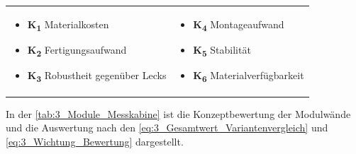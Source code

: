 \begin{tabular}{l l}
    \centering
    \hspace*{1cm} \parbox[c][3cm]{7cm}{
        \begin{itemize}[]
            \item \textbf{K\textsubscript{1}} Materialkosten
            \item \textbf{K\textsubscript{2}} Fertigungsaufwand
            \item \textbf{K\textsubscript{3}} Robustheit gegenüber Lecks
        \end{itemize}
    }&
    \parbox[c]{7cm}{
        \begin{itemize}[]
            \item \textbf{K\textsubscript{4}} Montageaufwand
            \item \textbf{K\textsubscript{5}} Stabilität
            \item \textbf{K\textsubscript{6}} Materialverfügbarkeit
        \end{itemize}
    }
\end{tabular}

In der \Tabelle\ref{tab:3_Module_Messkabine} ist die Konzeptbewertung der Modulwände und die Auswertung nach den \Gleichungen\eqref{eq:3_Gesamtwert_Variantenvergleich} und \eqref{eq:3_Wichtung_Bewertung} dargestellt.


